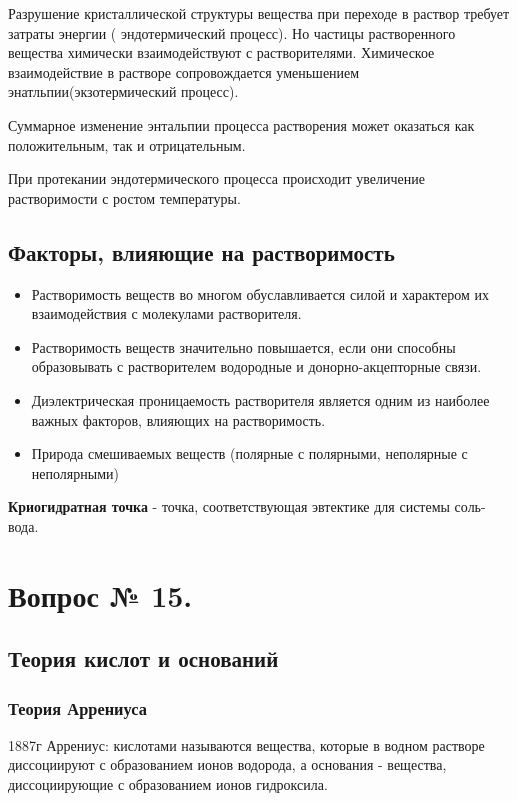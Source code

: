 \documentclass[14pt,a4paper]{scrartcl}
\begin{document}
Разрушение кристаллической структуры вещества при переходе в раствор требует затраты энергии ( эндотермический процесс). Но частицы растворенного вещества химически взаимодействуют с растворителями. Химическое взаимодействие в растворе сопровождается уменьшением энатльпии(экзотермический процесс). 

Суммарное изменение энтальпии процесса растворения может оказаться как положительным, так и отрицательным.

При протекании эндотермического процесса происходит увеличение растворимости с ростом температуры.

\subsection*{Факторы, влияющие на растворимость}
\begin{itemize}
\item Растворимость веществ во многом обуславливается силой и характером их взаимодействия с молекулами растворителя.

\item Растворимость веществ значительно повышается, если они способны образовывать с растворителем водородные и донорно-акцепторные связи.

\item Диэлектрическая проницаемость растворителя является одним из наиболее важных факторов, влияющих на растворимость.

\item Природа смешиваемых веществ (полярные с полярными, неполярные с неполярными)
\end{itemize}
\textbf{Криогидратная точка} - точка, соответствующая эвтектике для системы соль-вода.





\section*{Вопрос № 15.}
\subsection*{Теория кислот и оснований}
\subsubsection*{Теория Аррениуса}
1887г Аррениус: 
кислотами называются вещества, которые в водном растворе диссоциируют с образованием ионов водорода, а основания - вещества, диссоциирующие с образованием ионов гидроксила.
\end{document}
